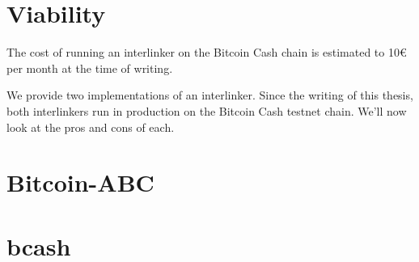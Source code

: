 \section{Viability}
The cost of running an interlinker on the Bitcoin Cash chain is estimated to 10€ per month at the time of writing.

We provide two implementations of an interlinker. Since the writing of this thesis, both interlinkers run in production on the Bitcoin Cash testnet chain. We'll now look at the pros and cons of each.

\section{Bitcoin-ABC}
\section{bcash}
